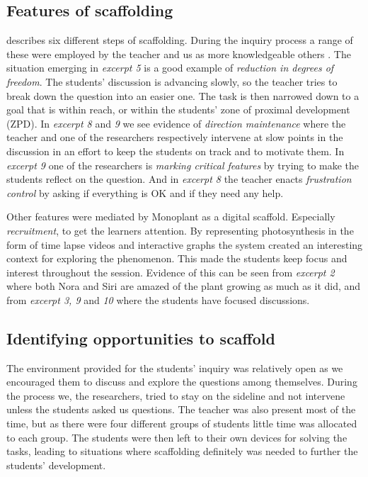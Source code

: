 \subsection{Features of scaffolding}
\citet{wood1976role} describes six different steps of scaffolding. During the inquiry process a range of these were employed by the teacher and us as more knowledgeable others \citep{vygotskiui1978mind}. The situation emerging in \emph{excerpt 5} is a good example of \emph{reduction in degrees of freedom}. The students' discussion is advancing slowly, so the teacher tries to break down the question into an easier one. The task is then narrowed down to a goal that is within reach, or within the students' zone of proximal development (ZPD). In \emph{excerpt 8} and \emph{9} we see evidence of \emph{direction maintenance} where the teacher and one of the researchers respectively intervene at slow points in the discussion in an effort to keep the students on track and to motivate them. In \emph{excerpt 9} one of the researchers is \emph{marking critical features} by trying to make the students reflect on the question. And in \emph{excerpt 8} the teacher enacts \emph{frustration control} by asking if everything is OK and if they need any help. 

Other features were mediated by Monoplant as a digital scaffold. Especially \emph{recruitment}, to get the learners attention. By representing photosynthesis in the form of time lapse videos and interactive graphs the system created an interesting context for exploring the phenomenon. This made the students keep focus and interest throughout the session. Evidence of this can be seen from \emph{excerpt 2} where both Nora and Siri are amazed of the plant growing as much as it did, and from \emph{excerpt 3, 9} and \emph{10} where the students have focused discussions. 


\subsection{Identifying opportunities to scaffold}
The environment provided for the students' inquiry was relatively open as we encouraged them to discuss and explore the questions among themselves. During the process we, the researchers, tried to stay on the sideline and not intervene unless the students asked us questions. The teacher was also present most of the time, but as there were four different groups of students little time was allocated to each group. The students were then left to their own devices for solving the tasks, leading to situations where scaffolding definitely was needed to further the students' development. 

